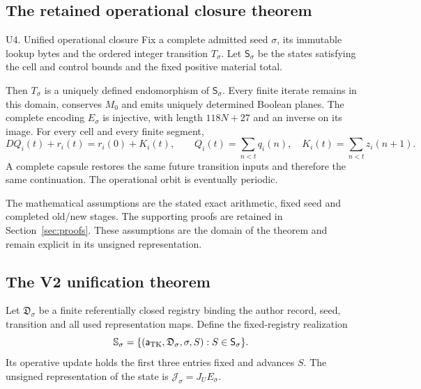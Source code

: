 \documentclass[11pt,a4paper]{article}
\numberwithin{equation}{section}
\begin{document}
\subsection{The retained operational closure theorem}
\begin{formal}{U4. Unified operational closure}
Fix a complete admitted seed $\sigma$, its immutable lookup bytes and the ordered integer transition $T_\sigma$. Let $\mathsf S_\sigma$ be the states satisfying the cell and control bounds and the fixed positive material total.

Then $T_\sigma$ is a uniquely defined endomorphism of $\mathsf S_\sigma$. Every finite iterate remains in this domain, conserves $M_0$ and emits uniquely determined Boolean planes. The complete encoding $E_\sigma$ is injective, with length $118N+27$ and an inverse on its image. For every cell and every finite segment,
\[
D Q_i(t)+r_i(t)=r_i(0)+K_i(t),\qquad
Q_i(t)=\sum_{n<t}q_i(n),\quad K_i(t)=\sum_{n<t}z_i(n+1).
\]
A complete capsule restores the same future transition inputs and therefore the same continuation. The operational orbit is eventually periodic.
\end{formal}
The mathematical assumptions are the stated exact arithmetic, fixed seed and completed old/new stages. The supporting proofs are retained in Section~\ref{sec:proofs}. These assumptions are the domain of the theorem and remain explicit in its unsigned representation.

\subsection{The V2 unification theorem}
Let $\mathfrak D_\sigma$ be a finite referentially closed registry binding the author record, seed, transition and all used representation maps. Define the fixed-registry realization
\begin{equation}
\mathbb S_\sigma=\{(\mathsf a_{\rm TK},\mathfrak D_\sigma,\sigma,S):S\in\mathsf S_\sigma\}.
\end{equation}
Its operative update holds the first three entries fixed and advances $S$. The unsigned representation of the state is $\mathcal J_\sigma=J_UE_\sigma$.
\end{document}
